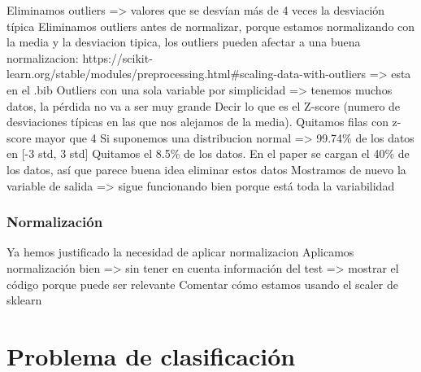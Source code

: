 \documentclass[11pt]{article}
\begin{document}
Eliminamos outliers => valores que se desvían más de 4 veces la desviación típica
Eliminamos outliers antes de normalizar, porque estamos normalizando con la media y la desviacion tipica, los outliers pueden afectar a una buena normalizacion: https://scikit-learn.org/stable/modules/preprocessing.html\#scaling-data-with-outliers => esta en el .bib
Outliers con una sola variable por simplicidad => tenemos muchos datos, la pérdida no va a ser muy grande
Decir lo que es el Z-score (numero de desviaciones típicas en las que nos alejamos de la media). Quitamos filas con z-score mayor que 4
Si suponemos una distribucion normal => 99.74\% de los datos en [-3 std, 3 std]
Quitamos el 8.5\% de los datos. En el paper se cargan el 40\% de los datos, así que parece buena idea eliminar estos datos
Mostramos de nuevo la variable de salida => sigue funcionando bien porque está toda la variabilidad

\subsubsection{Normalización}

Ya hemos justificado la necesidad de aplicar normalizacion
Aplicamos normalización bien => sin tener en cuenta información del test => mostrar el código porque puede ser relevante
Comentar cómo estamos usando el scaler de sklearn



\pagebreak
\section{Problema de clasificación}
\end{document}
